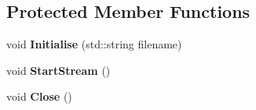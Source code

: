 \subsection*{Protected Member Functions}
\begin{DoxyCompactItemize}
\item 
void {\bfseries Initialise} (std\+::string filename)\hypertarget{classpangolin_1_1_ffmpeg_video_output_a48d467d91ed75ad84a9f8d34c89ac0aa}{}\label{classpangolin_1_1_ffmpeg_video_output_a48d467d91ed75ad84a9f8d34c89ac0aa}

\item 
void {\bfseries Start\+Stream} ()\hypertarget{classpangolin_1_1_ffmpeg_video_output_a99d272f5e6b7b72110a7c79c3d2b5b1a}{}\label{classpangolin_1_1_ffmpeg_video_output_a99d272f5e6b7b72110a7c79c3d2b5b1a}

\item 
void {\bfseries Close} ()\hypertarget{classpangolin_1_1_ffmpeg_video_output_af7097bb6c47222ee8c1a845df2cfccc6}{}\label{classpangolin_1_1_ffmpeg_video_output_af7097bb6c47222ee8c1a845df2cfccc6}

\end{DoxyCompactItemize}
